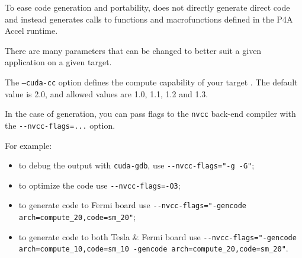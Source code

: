 \documentclass[a4paper]{article}
\begin{document}
To ease code generation and portability, \Apfa does not directly generate
direct \Acuda code and instead generates calls to functions and
macrofunctions defined in the P4A Accel runtime.

There are many parameters that can be changed to better suit a given
application on a given target. 

The \texttt{--cuda-cc} option defines the compute capability of your target 
\Agpu. The default value is 2.0, and allowed values are 1.0, 1.1, 1.2 and 1.3. 

In the case of \Acuda generation, you can pass flags to the \texttt{nvcc}
back-end compiler with the \verb|--nvcc-flags=...| option.

For example:
\begin{itemize}
\item to debug the output with \texttt{cuda-gdb}, use
  \verb|--nvcc-flags="-g -G"|;
\item to optimize the \Acuda code use \verb|--nvcc-flags=-O3|;
\item  to generate code to Fermi board use
  \verb|--nvcc-flags="-gencode arch=compute_20,code=sm_20"|;
\item to generate code to both Tesla \& Fermi board use
  \verb|--nvcc-flags="-gencode arch=compute_10,code=sm_10 -gencode arch=compute_20,code=sm_20"|.
\end{itemize}
\end{document}
